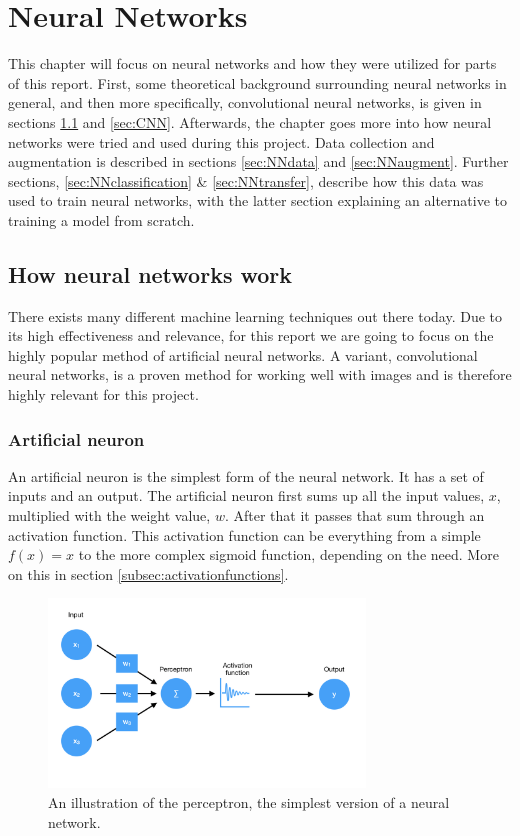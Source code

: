 \chapter{Neural Networks}
This chapter will focus on neural networks and how they were utilized for parts of this
report. First, some theoretical background surrounding neural networks in general, and then
more specifically, convolutional neural networks, is given in sections \ref{sec:NNwork}
and \ref{sec:CNN}.
Afterwards, the chapter goes more into how neural networks were tried and used during this project. Data collection and augmentation is described in sections \ref{sec:NNdata} and \ref{sec:NNaugment}. Further sections, \ref{sec:NNclassification} \& \ref{sec:NNtransfer}, describe how this data was used to train neural networks, with the latter section explaining an alternative to training a model from scratch. 
\section{How neural networks work}
\label{sec:NNwork}
There exists many different machine learning techniques out there today. Due to its high 
effectiveness and relevance, for this report we are going to focus on the highly popular 
method of artificial neural networks.
A variant, convolutional neural networks, is a proven method for working well with 
images and is therefore highly relevant for this project.

\subsection{Artificial neuron}
An artificial neuron is the simplest form of the neural network. It has a set of inputs and an output.
The artificial neuron first sums up all the input values, $x$, multiplied with the weight value, $w$.
After that it passes that sum through an activation function. This activation function can be everything from a simple $f(x)=x$ to the more complex sigmoid function, depending on the need. More on this in section \ref{subsec:activationfunctions}.

\begin{figure}[hbtp]
\begin{center}
\includegraphics[width = 0.75\textwidth]{./Images/perceptron.jpg} 
\caption{An illustration of the perceptron, the simplest version of a neural network.}
\end{center}
\end{figure}

